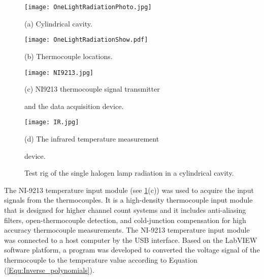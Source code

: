 \begin{figure}
  \begin{minipage}[t]{0.5\linewidth} %
  \nonumber
    \centering
    \texttt{[image: OneLightRadiationPhoto.jpg]}
    \centerline{(a) Cylindrical cavity.}
    \label{Fig:OneLightRadiationShow}
  \end{minipage}%
  \begin{minipage}[t]{0.5\linewidth}
    \centering
    \texttt{[image: OneLightRadiationShow.pdf]}
    \centerline{(b) Thermocouple locations.}
    \label{Fig:OneLightRadiationPhoto}
  \end{minipage}

  \begin{minipage}[t]{0.5\linewidth} %
  \nonumber
    \centering
    \texttt{[image: NI9213.jpg]}
    \centerline{(c) NI9213 thermocouple signal transmitter }
    \centerline{and the data acquisition device. }
    \label{Fig:NI9213}
  \end{minipage}%
  \begin{minipage}[t]{0.5\linewidth}
    \centering
    \texttt{[image: IR.jpg]}
    \centerline{(d) The infrared temperature measurement }
    \centerline{device.}
    \label{Fig:IR}
  \end{minipage}


  \caption{Test rig of the single halogen lamp radiation in a cylindrical cavity.}
  \label{Fig:OneLightRadiation}
\end{figure}

The NI-9213 temperature input module (see \ref{Fig:OneLightRadiation}(c)) was used to acquire the input signals from the thermocouples. It is a high-density thermocouple input module that is designed for higher channel count systems and it includes anti-aliasing filters, open-thermocouple detection, and cold-junction compensation for high accuracy thermocouple measurements. 
The NI-9213 temperature input module was connected to a host computer by the USB interface. Based on the LabVIEW software platform, a program was developed to converted the voltage signal of the thermocouple to the temperature value according to Equation (\ref{Equ:Inverse_polynomials}).


